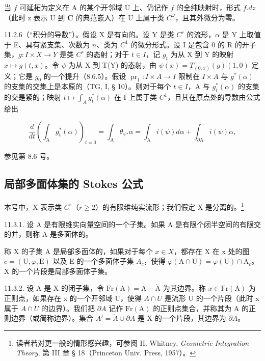 当 \(f\) 可延拓为定义在 A 的某个开邻域 U 上、仍记作 \(f\) 的全纯映射时，形式 \(f.dz\)（此时 z 表示 U 到 \(\mathbf{C}\) 的典范嵌入）在 U 上属于类 \(C^{\omega}\)，且其外微分为零。

11.2.6（“积分的导数”）。假设 X 是有向的。设 Y 是类 \(C^{r}\) 的流形，\(\alpha\) 是 Y 上取值于 E、具有紧支集、次数为 \(n\)、类为 \(C^{1}\) 的微分形式。设 I 是包含 0 的 R 的开子集，\(g: I \times X \to Y\) 是类 \(C^{r}\) 的态射；对于 \(t \in I\)，记 \(g_{t}\) 为从 X 到 Y 的映射 \(x \mapsto g(t, x)\)。令 \(\psi\) 为从 X 到 T(Y) 的态射，由 \(\psi(x) = T_{(0,x)}(g)(1,0)\) 定义；它是 \(g_{0}\) 的一个提升（8.6.5）。假设 \(\operatorname{pr}_{1}\colon I\times A\to I\) 限制在 \(I\times A\) 与 \(g^{*}(\alpha)\) 的支集的交集上是本原的（TG, I, § 10）。则对于每个 \(t \in I\)，A 与 \(g_{t}^{*}(\alpha)\) 的支集的交是紧的；映射 \(t \mapsto \int_{A} g_{t}^{*}(\alpha)\) 在 I 上属于类 \(C^{1}\)，且其在原点处的导数由公式给出

\[
\frac {d}{d t} \left(\int_ {\mathrm{A}} g _ {t} ^ {*} (\alpha)\right) _ {t = 0} = \int_ {\mathrm{A}} \theta_ {\psi}. \alpha = \int_ {\mathrm{A}} i (\psi) d \alpha + \int_ {\partial \mathrm{A}} i (\psi) \alpha ,
\]

参见第 8.6 号。

\subsection{局部多面体集的 Stokes 公式}

本号中，X 表示类 \(C^{r}\)（\(r \geqslant 2\)）的有限维纯实流形；我们假定 X 是分离的。\footnote{读者若对更一般的情形感兴趣，可参阅 H. Whitney, \emph{Geometric Integration Theory}, 第 III 章 § 18（Princeton Univ. Press, 1957）。}

11.3.1. 设 A 是有限维实向量空间的一个子集。如果 A 是有限个闭半空间的有限交的并，则称 A 是多面体的。

称 X 的子集 A 是局部多面体的，如果对于每个 \(x \in X\)，都存在 X 在 x 处的图 \(c = (\mathrm{U}, \varphi, \mathrm{E})\) 以及 E 的一个多面体子集 \(A_{c}\)，使得 \(\varphi(\mathrm{A} \cap \mathrm{U}) = \varphi(\mathrm{U}) \cap \mathrm{A}_{c}\)。X 的一个片段是局部多面体子集。

11.3.2. 设 A 是 X 的闭子集，令 \(\mathrm{Fr}(\mathrm{A}) = \mathrm{A} - \mathring{\mathrm{A}}\) 为其边界。称 \(x \in \mathrm{Fr}(\mathrm{A})\) 为正则点，如果存在 x 的一个开邻域 U，使得 \(A \cap U\) 是流形 U 的一个片段（此时 x 属于 \(A \cap U\) 的边界）。我们把 \(\partial A\) 记作 \(\mathrm{Fr}(\mathrm{A})\) 的正则点集合，并称其为 A 的正则边界（或简称边界）。集合 \(A' = \mathring{A} \cup \partial A\) 是 X 的一个片段，其边界为 \(\partial A\)。

